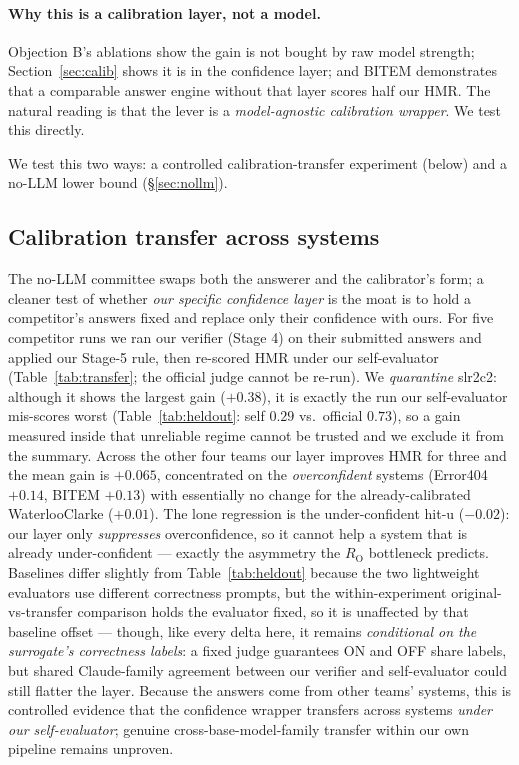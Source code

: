 \documentclass[sigconf,nonacm]{acmart}
\newcommand{\HMR}{\textsc{HMR}}
\newcommand{\RO}{R_{\mathrm{O}}}
\begin{document}
\paragraph{Why this is a calibration layer, not a model.} Objection B's ablations show the
gain is not bought by raw model strength; Section~\ref{sec:calib} shows it is in the
confidence layer; and BITEM demonstrates that a comparable answer engine without that layer
scores half our \HMR. The natural reading is that the lever is a \emph{model-agnostic
calibration wrapper}. We test this directly.

We test this two ways: a controlled calibration-transfer experiment (below) and a no-LLM
lower bound (\S\ref{sec:nollm}).

\subsection{Calibration transfer across systems}
\label{sec:transfer}
The no-LLM committee swaps both the answerer and the calibrator's form; a cleaner test of
whether \emph{our specific confidence layer} is the moat is to hold a competitor's answers
fixed and replace only their confidence with ours. For five competitor runs we ran our
verifier (Stage 4) on their submitted answers and applied our Stage-5 rule, then re-scored
\HMR{} under our self-evaluator (Table~\ref{tab:transfer}; the official judge cannot be
re-run). We \emph{quarantine} slr2c2: although it shows the largest gain ($+0.38$), it is
exactly the run our self-evaluator mis-scores worst (Table~\ref{tab:heldout}: self $0.29$
vs.\ official $0.73$), so a gain measured inside that unreliable regime cannot be trusted and
we exclude it from the summary. Across the other four teams our layer improves \HMR{} for
three and the mean gain is $+0.065$, concentrated on the \emph{overconfident} systems
(Error404 $+0.14$, BITEM $+0.13$) with essentially no change for the already-calibrated
WaterlooClarke ($+0.01$). The lone regression is the under-confident hit-u ($-0.02$): our layer
only \emph{suppresses} overconfidence, so it cannot help a system that is already
under-confident --- exactly the asymmetry the $\RO$ bottleneck predicts. Baselines differ
slightly from Table~\ref{tab:heldout} because the two lightweight evaluators use different
correctness prompts, but the within-experiment original-vs-transfer comparison holds the
evaluator fixed, so it is unaffected by that baseline offset --- though, like every delta
here, it remains \emph{conditional on the surrogate's correctness labels}: a fixed judge
guarantees ON and OFF share labels, but shared Claude-family agreement between our verifier
and self-evaluator could still flatter the layer. Because the answers come from other teams'
systems, this is controlled evidence that the confidence wrapper transfers across systems
\emph{under our self-evaluator}; genuine cross-base-model-family transfer within our own
pipeline remains unproven.
\end{document}
